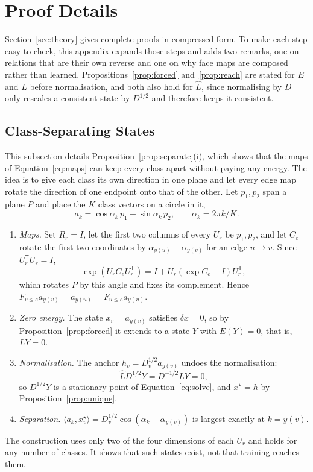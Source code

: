 \documentclass{article}
\newcommand{\transpose}{\mathsf{T}}
\newcommand{\inc}{\trianglelefteq}
\begin{document}
\section{Proof Details}
\label{app:proofs}
Section~\ref{sec:theory} gives complete proofs in compressed form. To make each step easy to check, this appendix expands those steps and adds two remarks, one on relations that are their own reverse and one on why face maps are composed rather than learned. Propositions~\ref{prop:forced} and~\ref{prop:reach} are stated for $E$ and $L$ before normalisation, and both also hold for $\hat L$, since normalising by $D$ only rescales a consistent state by $D^{1/2}$ and therefore keeps it consistent.

\subsection{Class-Separating States}
\label{app:separate}
This subsection details Proposition~\ref{prop:separate}(i), which shows that the maps of Equation~\eqref{eq:maps} can keep every class apart without paying any energy. The idea is to give each class its own direction in one plane and let every edge map rotate the direction of one endpoint onto that of the other. Let $p_1,p_2$ span a plane $P$ and place the $K$ class vectors on a circle in it,
\begin{equation*}
  a_k=\cos\alpha_k\,p_1+\sin\alpha_k\,p_2,\qquad \alpha_k=2\pi k/K .
\end{equation*}
\begin{enumerate}
  \item \emph{Maps.} Set $R_r=I$, let the first two columns of every $U_r$ be $p_1,p_2$, and let $C_e$ rotate the first two coordinates by $\alpha_{y(u)}-\alpha_{y(v)}$ for an edge $u\to v$. Since $U_r^{\transpose}U_r=I$,
  \begin{equation*}
    \exp(U_rC_eU_r^{\transpose})=I+U_r(\exp C_e-I)U_r^{\transpose},
  \end{equation*}
  which rotates $P$ by this angle and fixes its complement. Hence $F_{v\inc e}a_{y(v)}=a_{y(u)}=F_{u\inc e}a_{y(u)}$.
  \item \emph{Zero energy.} The state $x_v=a_{y(v)}$ satisfies $\delta x=0$, so by Proposition~\ref{prop:forced} it extends to a state $Y$ with $E(Y)=0$, that is, $LY=0$.
  \item \emph{Normalisation.} The anchor $h_v=D_v^{1/2}a_{y(v)}$ undoes the normalisation:
  \begin{equation*}
    \hat L D^{1/2}Y=D^{-1/2}LY=0,
  \end{equation*}
  so $D^{1/2}Y$ is a stationary point of Equation~\eqref{eq:solve}, and $x^\star=h$ by Proposition~\ref{prop:unique}.
  \item \emph{Separation.} $\langle a_k,x^\star_v\rangle=D_v^{1/2}\cos(\alpha_k-\alpha_{y(v)})$ is largest exactly at $k=y(v)$.
\end{enumerate}
The construction uses only two of the four dimensions of each $U_r$ and holds for any number of classes. It shows that such states exist, not that training reaches them.
\end{document}
